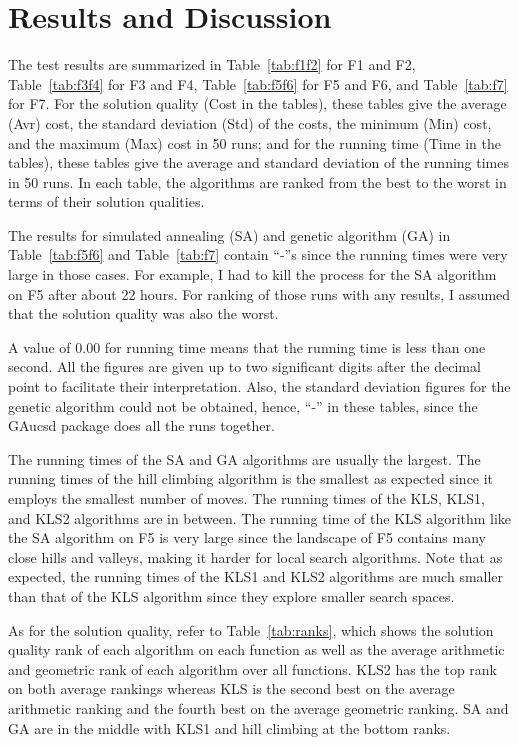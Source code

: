 \documentclass{article}
\begin{document}
\section{Results and Discussion}
\label{sec:results}

The test results are summarized in Table~\ref{tab:f1f2} for F1 and F2,
Table~\ref{tab:f3f4} for F3 and F4, Table~\ref{tab:f5f6} for F5 and
F6, and Table~\ref{tab:f7} for F7. For the solution quality (Cost in
the tables), these tables give the average (Avr) cost, the standard
deviation (Std) of the costs, the minimum (Min) cost, and the maximum
(Max) cost in 50 runs; and for the running time (Time in the tables),
these tables give the average and standard deviation of the running
times in 50 runs. In each table, the algorithms are ranked from the
best to the worst in terms of their solution qualities.

The results for simulated annealing (SA) and genetic algorithm (GA) in
Table~\ref{tab:f5f6} and Table~\ref{tab:f7} contain ``-''s since the
running times were very large in those cases. For example, I had to
kill the process for the SA algorithm on F5 after about 22 hours. For
ranking of those runs with any results, I assumed that the solution
quality was also the worst.

A value of $0.00$ for running time means that the running time is less
than one second. All the figures are given up to two significant
digits after the decimal point to facilitate their
interpretation. Also, the standard deviation figures for the genetic
algorithm could not be obtained, hence, ``-'' in these tables, since
the GAucsd package does all the runs together.

The running times of the SA and GA algorithms are usually the
largest. The running times of the hill climbing algorithm is the
smallest as expected since it employs the smallest number of
moves. The running times of the KLS, KLS1, and KLS2 algorithms are in
between. The running time of the KLS algorithm like the SA algorithm
on F5 is very large since the landscape of F5 contains many close
hills and valleys, making it harder for local search algorithms. Note
that as expected, the running times of the KLS1 and KLS2 algorithms
are much smaller than that of the KLS algorithm since they explore
smaller search spaces.

As for the solution quality, refer to Table~\ref{tab:ranks}, which
shows the solution quality rank of each algorithm on each function as
well as the average arithmetic and geometric rank of each algorithm
over all functions. KLS2 has the top rank on both average rankings
whereas KLS is the second best on the average arithmetic ranking and
the fourth best on the average geometric ranking. SA and GA are in the
middle with KLS1 and hill climbing at the bottom ranks.
\end{document}
